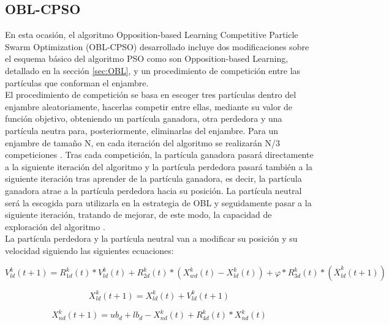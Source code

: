 
\subsection{OBL-CPSO}
En esta ocasión, el algoritmo Opposition-based Learning Competitive Particle Swarm Optimization (OBL-CPSO) \cite{oblcpso} desarrollado incluye dos modificaciones sobre el esquema básico del algoritmo PSO como son Opposition-based Learning, detallado en la sección \ref{sec:OBL}, y un procedimiento de competición entre las partículas que conforman el enjambre. \\

El procedimiento de competición se basa en escoger tres partículas dentro del enjambre aleatoriamente, hacerlas competir entre ellas, mediante su valor de función objetivo, obteniendo un partícula ganadora, otra perdedora y una partícula neutra para, posteriormente, eliminarlas del enjambre. Para un enjambre de tamaño N, en cada iteración del algoritmo se realizarán N/3 competiciones \cite{oblcpso}. Tras cada competición, la partícula ganadora pasará directamente a la siguiente iteración del algoritmo y la partícula perdedora pasará también a la siguiente iteración tras aprender de la partícula ganadora, es decir, la partícula ganadora atrae a la partícula perdedora hacia su posición. La partícula neutral será la escogida para utilizarla en la estrategia de OBL y seguidamente pasar a la siguiente iteración, tratando de mejorar, de este modo, la capacidad de exploración del algoritmo \cite{oblcpso}. \\

La partícula perdedora y la partícula neutral van a modificar su posición y su velocidad siguiendo las siguientes ecuaciones:

\begin{equation} \label{eq:7}
    V^{k}_{ld}(t+1) = R^{k}_{1d}(t) * V^{k}_{ld}(t) + R^{k}_{2d}(t) * (X^{k}_{wd}(t) - X^{k}_{ld}(t)) + \varphi * R^{k}_{3d}(t) * (\overline{X}^{k}_{ld}(t+1)) 
\end{equation}

\begin{equation} \label{eq:8}
     X^{k}_{ld}(t+1) = X^{k}_{ld}(t) + V^{k}_{ld}(t+1)
\end{equation}

\begin{equation} \label{eq:9}
     X^{k}_{nd}(t+1) = ub_{d} + lb_{d} - X^{k}_{nd}(t) + R^{k}_{4d}(t) * X^{k}_{nd}(t)
\end{equation}

